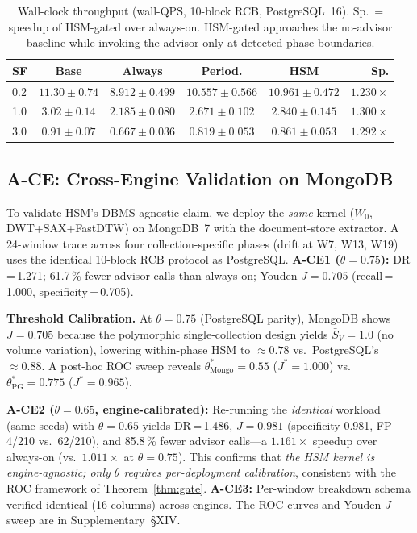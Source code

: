 \documentclass[10pt,twocolumn,a4paper]{article}
\newcommand{\thetastar}{\theta^{*}}
\begin{document}
\begin{table}[!htb]\centering\scriptsize
\caption{Wall-clock throughput (wall-QPS, 10-block RCB, PostgreSQL~16). Sp.\ = speedup of HSM-gated over always-on. HSM-gated approaches the no-advisor baseline while invoking the advisor only at detected phase boundaries.}\label{tab:throughput}
\setlength{\tabcolsep}{3pt}
\begin{tabular}{@{}lccccr@{}}
\toprule
\textbf{SF} & \textbf{Base} & \textbf{Always} & \textbf{Period.} & \textbf{HSM} & \textbf{Sp.}\\
\midrule
0.2 & $11.30\!\pm\!0.74$ & $8.912\!\pm\!0.499$ & $10.557\!\pm\!0.566$ & $10.961\!\pm\!0.472$ & $1.230\times$ \\
1.0 & $3.02\!\pm\!0.14$ & $2.185\!\pm\!0.080$ & $2.671\!\pm\!0.102$ & $2.840\!\pm\!0.145$ & $1.300\times$ \\
3.0 & $0.91\!\pm\!0.07$ & $0.667\!\pm\!0.036$ & $0.819\!\pm\!0.053$ & $0.861\!\pm\!0.053$ & $1.292\times$ \\
\bottomrule
\end{tabular}
\end{table}

\FloatBarrier
\subsection{A-CE: Cross-Engine Validation on MongoDB}\label{sec:mongo-exp}

To validate HSM's DBMS-agnostic claim, we deploy the \emph{same} kernel
($W_0$, DWT+SAX+FastDTW) on MongoDB~7 with the document-store extractor.
A 24-window trace across four collection-specific phases (drift at W7, W13, W19)
uses the identical 10-block RCB protocol as PostgreSQL.
\textbf{A-CE1 ($\theta\!=\!0.75$):} DR\,=\,1.271; 61.7\,\% fewer advisor calls than always-on;
Youden $J\!=\!0.705$ (recall\,=\,1.000, specificity\,=\,0.705).

\textbf{Threshold Calibration.}
At $\theta\!=\!0.75$ (PostgreSQL parity), MongoDB shows $J\!=\!0.705$
because the polymorphic single-collection design yields $\bar{S}_V\!=\!1.0$
(no volume variation), lowering within-phase HSM to $\approx\!0.78$ vs.\
PostgreSQL's $\approx\!0.88$.
A post-hoc ROC sweep reveals
$\thetastar_{\mathrm{Mongo}}\!=\!0.55$ ($J^*\!=\!1.000$) vs.\
$\thetastar_{\mathrm{PG}}\!=\!0.775$ ($J^*\!=\!0.965$).

\textbf{A-CE2 ($\theta\!=\!0.65$, engine-calibrated):} Re-running the
\emph{identical} workload (same seeds) with $\theta\!=\!0.65$ yields
DR\,=\,1.486, $J\!=\!0.981$ (specificity 0.981, FP 4/210 vs.\ 62/210),
and 85.8\,\% fewer advisor calls---a $1.161\times$ speedup over always-on
(vs.\ $1.011\times$ at $\theta\!=\!0.75$).
This confirms that \emph{the HSM kernel is engine-agnostic; only $\theta$
requires per-deployment calibration}, consistent with the ROC framework
of Theorem~\ref{thm:gate}.
\textbf{A-CE3:} Per-window breakdown schema verified identical (16 columns) across engines.
The ROC curves and Youden-$J$ sweep are in Supplementary~\S XIV.
\end{document}
